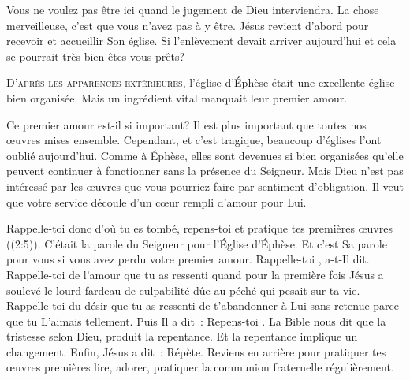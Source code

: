 Vous ne voulez pas être ici quand le jugement de Dieu interviendra.
 La chose merveilleuse, c'est que vous n'avez pas à y être.
 Jésus revient d'abord pour recevoir et accueillir Son église. 
 Si l'enlèvement devait arriver aujourd'hui
 \ocadr et cela se pourrait très bien \fcadr{} êtes-vous prêts? 

\dvrule






\lettrine{D}{'après les apparences extérieures,}
 l'église d'Éphèse était une excellente église bien organisée.
 Mais un ingrédient vital manquait \ocadr leur premier amour. 

Ce premier amour est-il si important?
 Il est plus important que toutes nos œuvres mises ensemble.
 Cependant, et c'est tragique,
 beaucoup d'églises l'ont oublié aujourd'hui.
 Comme à Éphèse, elles sont devenues si bien organisées
 qu'elle peuvent continuer à fonctionner sans la présence du Seigneur.
 Mais Dieu n'est pas intéressé par les œuvres que vous pourriez faire
 par sentiment d'obligation. Il veut que votre service découle
 d'un cœur rempli d'amour pour Lui. 


\og Rappelle-toi donc d'où tu es tombé, repens-toi
 et pratique tes premières œuvres \fg{} ((2:5)).
 C'était la parole du Seigneur pour l'Église d'Éphèse.
 Et c'est Sa parole pour vous si vous avez perdu votre premier amour.
 \og Rappelle-toi \fg{},  a-t-Il dit.
 Rappelle-toi de l'amour que tu as ressenti quand pour la première fois
 Jésus a soulevé le lourd fardeau de culpabilité dûe au péché
 qui pesait sur ta vie. Rappelle-toi du désir que tu as ressenti
 de t'abandonner à Lui sans retenue parce que tu L'aimais tellement.
 Puis Il a dit~:  \og Repens-toi \fg{}.
 La Bible nous dit que la tristesse selon Dieu, produit la repentance.
 Et la repentance implique un changement. Enfin, Jésus a dit~: 
 \og Répète. \fg{} Reviens en arrière pour pratiquer tes œuvres premières
 \ocadr lire, adorer, pratiquer la communion fraternelle régulièrement. 

